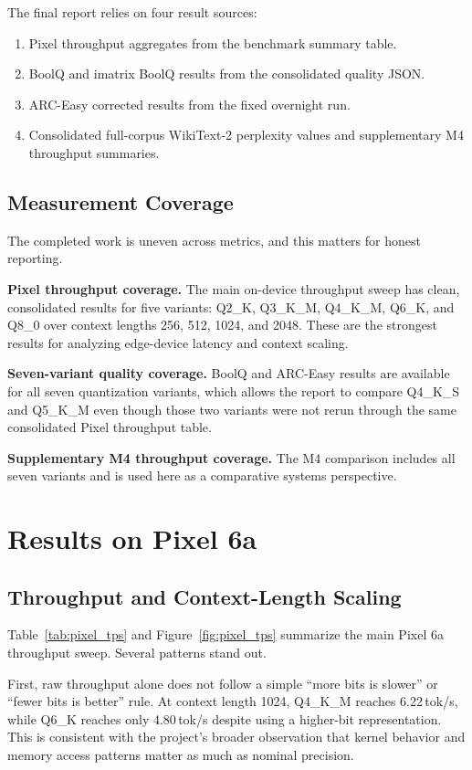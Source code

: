 \documentclass{article}
\begin{document}
The final report relies on four result sources:
\begin{enumerate}
  \item Pixel throughput aggregates from the benchmark summary table.
  \item BoolQ and imatrix BoolQ results from the consolidated quality JSON.
  \item ARC-Easy corrected results from the fixed overnight run.
  \item Consolidated full-corpus WikiText-2 perplexity values and supplementary M4 throughput summaries.
\end{enumerate}

\subsection{Measurement Coverage}

The completed work is uneven across metrics, and this matters for honest reporting.

\textbf{Pixel throughput coverage.} The main on-device throughput sweep has clean, consolidated results for five variants: Q2\_K, Q3\_K\_M, Q4\_K\_M, Q6\_K, and Q8\_0 over context lengths 256, 512, 1024, and 2048. These are the strongest results for analyzing edge-device latency and context scaling.

\textbf{Seven-variant quality coverage.} BoolQ and ARC-Easy results are available for all seven quantization variants, which allows the report to compare Q4\_K\_S and Q5\_K\_M even though those two variants were not rerun through the same consolidated Pixel throughput table.

\textbf{Supplementary M4 throughput coverage.} The M4 comparison includes all seven variants and is used here as a comparative systems perspective.

\section{Results on Pixel 6a}
\label{sec:pixel}

\subsection{Throughput and Context-Length Scaling}

Table~\ref{tab:pixel_tps} and Figure~\ref{fig:pixel_tps} summarize the main Pixel 6a throughput sweep. Several patterns stand out.

First, raw throughput alone does not follow a simple ``more bits is slower'' or ``fewer bits is better'' rule. At context length 1024, Q4\_K\_M reaches 6.22\,tok/s, while Q6\_K reaches only 4.80\,tok/s despite using a higher-bit representation. This is consistent with the project's broader observation that kernel behavior and memory access patterns matter as much as nominal precision.
\end{document}
